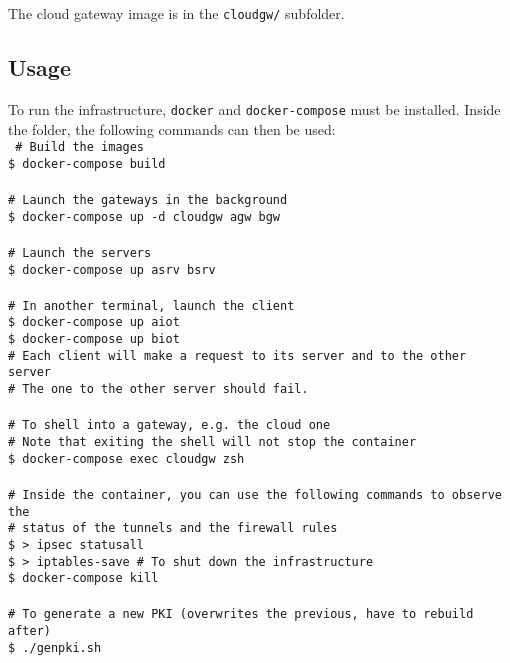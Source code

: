 \documentclass[paper=a4, fontsize=11pt]{scrartcl}
\begin{document}
The cloud gateway image is in the \texttt{cloudgw/} subfolder.

\subsection{Usage}

To run the infrastructure, \texttt{docker} and \texttt{docker-compose} must be
installed.
Inside the folder, the following commands can then be used:\\
\texttt{%
    \# Build the images \\
    \$ docker-compose build
    \\ \\
    \# Launch the gateways in the background \\
    \$ docker-compose up -d cloudgw agw bgw
    \\ \\
    \# Launch the servers \\
    \$ docker-compose up asrv bsrv
    \\ \\
    \# In another terminal, launch the client \\
    \$ docker-compose up aiot \\
    \$ docker-compose up biot \\
    \# Each client will make a request to its server and to the other server \\
    \# The one to the other server should fail.
    \\ \\
    \# To shell into a gateway, e.g.\ the cloud one \\
    \# Note that exiting the shell will not stop the container \\
    \$ docker-compose exec cloudgw zsh
    \\ \\
    \# Inside the container, you can use the following commands to observe the \\
    \# status of the tunnels and the firewall rules \\
    \$ > ipsec statusall \\
    \$ > iptables-save
    \# To shut down the infrastructure \\
    \$ docker-compose kill
    \\ \\
    \# To generate a new PKI (overwrites the previous, have to rebuild after) \\
    \$~./genpki.sh
}
\end{document}
